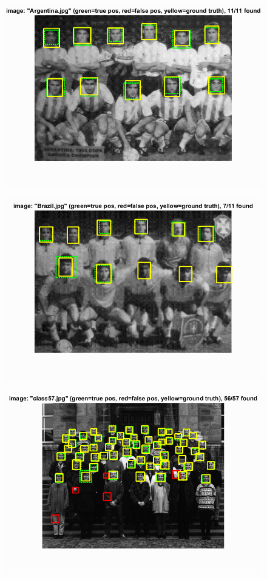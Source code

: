 \documentclass{article}
\begin{document}
\begin{figure}[!htb]
 \centering
  \includegraphics[width=.8\textwidth]{sample1.png}
\end{figure}%
\begin{figure}[!htb]
 \centering
  \includegraphics[width=.9\textwidth]{sample2.png}
\end{figure}%
\begin{figure}[!htb]
 \centering
  \includegraphics[width=.9\textwidth]{sample3.png}
\end{figure}%
\end{document}
